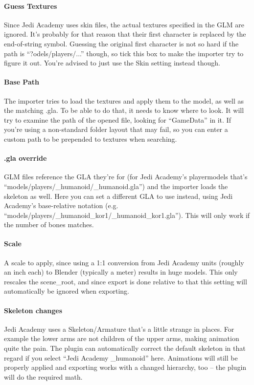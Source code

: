 \documentclass[a4paper,10pt]{article}
\begin{document}
 \paragraph*{Guess Textures}
 Since Jedi Academy uses skin files, the actual textures specified in the GLM are ignored. It's probably for
 that reason that their first character is replaced by the end-of-string symbol. Guessing the original first
 character is not so hard if the path is ``?odels/players/...'' though, so tick this box to make the importer
 try to figure it out. You're advised to just use the Skin setting instead though.
 
 \paragraph*{Base Path}
 The importer tries to load the textures and apply them to the model, as well as the matching .gla. To be able
 to do that, it needs to know where to look. It will try to examine the path of the opened file, looking for
 ``GameData'' in it. If you're using a non-standard folder layout that may fail, so you can enter a custom path
 to be prepended to textures when searching.
 
 \paragraph*{.gla override}
 GLM files reference the GLA they're for (for Jedi Academy's playermodels that's
 ``models/players/\_humanoid/\_humanoid.gla'') and the importer loads the skeleton as well. Here you can set
 a different GLA to use instead, using Jedi Academy's base-relative notation (e.g.\\
 ``models/players/\_humanoid\_kor1/\_humanoid\_kor1.gla''). This will only work if the number of bones matches.
 
 \paragraph*{Scale}
 A scale to apply, since using a 1:1 conversion from Jedi Academy units (roughly an inch each) to Blender
 (typically a meter) results in huge models. This only rescales the scene\_root, and since export is done
 relative to that this setting will automatically be ignored when exporting.
 
 \paragraph*{Skeleton changes}
 Jedi Academy uses a Skeleton/Armature that's a little strange in places. For example the lower arms are not
 children of the upper arms, making animation quite the pain. The plugin can automatically correct the
 default skeleton in that regard if you select ``Jedi Academy \_humanoid'' here. Animations will still be
 properly applied and exporting works with a changed hierarchy, too -- the plugin will do the required math.
 
\end{document}
